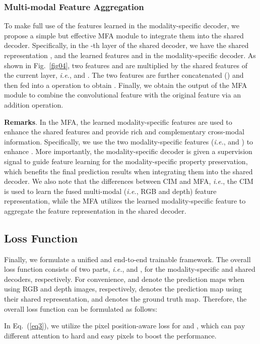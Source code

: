 \documentclass[10pt,twocolumn,letterpaper]{article}
\def\ie{\emph{i.e.}}
\begin{document}
\subsubsection{Multi-modal Feature Aggregation}
\label{MFA}

To make full use of the features learned in the modality-specific decoder, we propose a simple but effective MFA module to integrate them into the shared decoder. Specifically, in the -th layer of the shared decoder, we have the shared representation , and the learned features  and  in the modality-specific decoder. As shown in Fig.~\ref{fig04}, two features  and  are multiplied by the shared features of the current layer, \ie,  and . The two features are further concatenated () and then fed into a  operation to obtain . Finally, we obtain the output of the MFA module to combine the convolutional feature  with the original feature  via an addition operation.


\textbf{Remarks}. In the MFA, the learned modality-specific features are used to enhance the shared features and provide rich and complementary cross-modal information. Specifically, we use the two modality-specific features (\ie,  and ) to enhance . More importantly, the modality-specific decoder is given a supervision signal to guide feature learning for the modality-specific property preservation, which benefits the final prediction results when integrating them into the shared decoder. We also note that the differences between CIM and MFA, \ie, the CIM is used to learn the fused multi-modal (\ie, RGB and depth) feature representation, while the MFA utilizes the learned modality-specific feature to aggregate the feature representation in the shared decoder.



\subsection{Loss Function}
\label{sec3.4}

Finally, we formulate a unified and end-to-end trainable framework. The overall loss function consists of two parts, \ie,  and , for the modality-specific and shared decoders, respectively. For convenience,  and  denote the prediction maps when using RGB and depth images, respectively,  denotes the prediction map using their shared representation, and  denotes the ground truth map. Therefore, the overall loss function can be formulated as follows:


In Eq.~(\ref{eq3}), we utilize the pixel position-aware loss \cite{wei2019f3net} for  and , which can pay different attention to hard and easy pixels to boost the performance.
\end{document}
